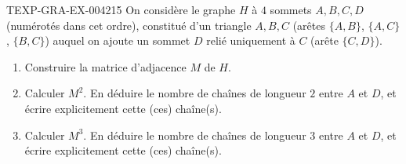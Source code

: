 \begin{exercice}{TEXP-GRA-EX-004}{2}{15}
On considère le graphe $H$ à $4$ sommets $A,B,C,D$ (numérotés dans cet ordre), constitué d'un triangle $A,B,C$ (arêtes $\{A,B\}$, $\{A,C\}$, $\{B,C\}$) auquel on ajoute un sommet $D$ relié uniquement à $C$ (arête $\{C,D\}$).
\begin{enumerate}
  \item Construire la matrice d'adjacence $M$ de $H$.
  \item Calculer $M^2$. En déduire le nombre de chaînes de longueur $2$ entre $A$ et $D$, et écrire explicitement cette (ces) chaîne(s).
  \item Calculer $M^3$. En déduire le nombre de chaînes de longueur $3$ entre $A$ et $D$, et écrire explicitement cette (ces) chaîne(s).
\end{enumerate}
\end{exercice}
